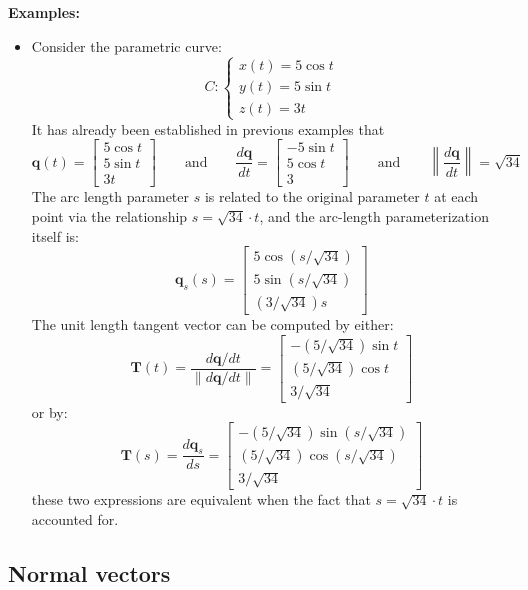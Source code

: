 \documentclass{article}
\begin{document}
\textbf{Examples:}
\begin{itemize}
\item Consider the parametric curve:
\[C: \left\{\begin{array}{c} 
x(t) = 5 \cos t \\  
y(t) = 5 \sin t \\ 
z(t) = 3t 
\end{array}\right.\]
It has already been established in previous examples that
\[\mathbf{q}(t) = \begin{bmatrix}
5 \cos t \\  
5 \sin t \\ 
3t 
\end{bmatrix} \quad\quad\text{and}\quad\quad \frac{d\mathbf{q}}{dt} = \begin{bmatrix}
-5 \sin t \\  
5 \cos t \\ 
3  
\end{bmatrix} \quad\quad\text{and}\quad\quad \left\|\frac{d\mathbf{q}}{dt}\right\| = \sqrt{34}\] 
The arc length parameter \(s\) is related to the original parameter \(t\) at each point via the relationship \(s = \sqrt{34} \cdot t\), and the arc-length parameterization itself is:
\[\mathbf{q}_s(s) = \begin{bmatrix}  
5 \cos(s/\sqrt{34}) \\  
5 \sin(s/\sqrt{34}) \\ 
(3/\sqrt{34})s 
\end{bmatrix}\] 
The unit length tangent vector can be computed by either: 
\[\mathbf{T}(t) = \frac{d\mathbf{q}/dt}{\|d\mathbf{q}/dt\|} = \begin{bmatrix}
-(5/\sqrt{34}) \sin t \\  
(5/\sqrt{34}) \cos t \\ 
3/\sqrt{34}  
\end{bmatrix}\]
or by: 
\[\mathbf{T}(s) = \frac{d\mathbf{q}_s}{ds} = \begin{bmatrix}  
-(5/\sqrt{34}) \sin(s/\sqrt{34}) \\  
(5/\sqrt{34}) \cos(s/\sqrt{34}) \\ 
3/\sqrt{34} 
\end{bmatrix}\]
these two expressions are equivalent when the fact that \(s = \sqrt{34} \cdot t\) is accounted for.
\end{itemize}





\subsection*{Normal vectors}
\end{document}
